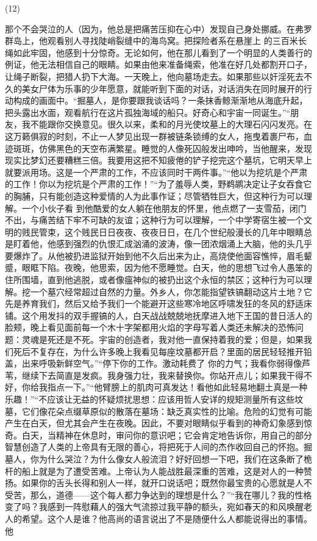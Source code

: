 \documentclass{article}
\begin{document}
(12) 

那个不会哭泣的人（因为，他总是把痛苦压抑在心中）发现自己身处挪威。在弗罗群岛上，他观看别人寻找陡峭裂缝中的海鸟窝。把探险者系在悬崖上
\newpage
的三百米长绳如此牢固，他感到十分惊奇。无论如何，他在那儿看到了一个明显的人类善行的例证，他无法相信自己的眼睛。如果由他来准备绳索，他准在好几处都割开口子，让绳子断裂，把猎人扔下大海。一天晚上，他向墓场走去。如果那些以奸淫死去不久的美女尸体为乐事的少年愿意，就能听到下面的对话，对话消失在同时展开的行动构成的画面中。“掘墓人，是你要跟我谈话吗？一条抹香鲸渐渐地从海底升起，把头露出水面，观看航行在这片孤独海域的船只。好奇心和宇宙一同诞生。”“朋友，我不能跟你交换意见。很久以来，柔和的月光使坟墓上的大理石闪闪发亮。在这万籁俱寂的时刻，不止一人梦见出现一群被链条锁缚的女人，拖曳着裹尸布，血迹斑斑，仿佛黑色的天空布满繁星。睡觉的人像死囚般发出呻吟，当他醒来，发现现实比梦幻还要糟糕三倍。我要用这把不知疲倦的铲子挖完这个墓坑，它明天早上就要派用场。这是一个严肃的工作，不应该同时干两件事。”“他以为挖坑是个严肃的工作！你以为挖坑是个严肃的工作！”“为了羞辱人类，野鹈鹕决定让子女吞食它的胸脯，只有能创造这种爱情的人为此事作证；尽管牺牲巨大，但这种行为可以理解。一个小伙子看
\newpage
到他酷爱的女人躺在他朋友的怀里，他点燃了一支雪茄，闭门不出，与痛苦结下牢不可缺的友谊；这种行为可以理解，一个中学寄宿生被一个文明的贱民管束，这个贱民日日夜夜、夜夜日日，在几个世纪般漫长的几年中眼睛总是盯着他，他感到强烈的仇恨汇成汹涌的波涛，像一团浓烟涌上大脑，他的头几乎要爆炸了。从他被扔进监狱开始到他不久后出来为止，高烧使他面容憔悴，眉毛颦蹙，眼眶下陷。夜晚，他思索，因为他不愿睡觉。白天，他的思想飞过令人愚笨的住所围墙，直到他逃脱，或者像瘟神似的被扔出这个永恒的禁区；这种行为可以理解。挖一个墓穴经常超过自然的力量。外乡人，你怎能指望铁镐翻动这片土地？它先是养育我们，然后又给予我们一个能避开这些寒冷地区呼啸发狂的冬风的舒适床铺。这个用发抖的双手握镐的人，白天战战兢兢地抚摩进入地下王国的昔日活人的脸颊，晚上看见面前每一个木十字架都用火焰的字母写着人类还未解决的恐怖问题：灵魂是死还是不死。宇宙的创造者，我对他一直保持着我的爱；但是，如果我们死后不复存在，为什么许多晚上我看见每座坟墓都开启？里面的居民轻轻推开铅盖，出来呼吸新鲜空气。”“停下你的工作。激动耗费了
\newpage
你的力气；我看你弱得像芦苇，继续下去简直是发疯。我身强力壮，我来替换你。你站开点儿；如果我干得不好，你给我指点一下。”“他臂膀上的肌肉可真发达！看他如此轻易地翻土真是一种乐趣！”“不应该让无益的怀疑烦扰思想：应该用哲人安详的规矩测量所有这些坟墓，它们像花朵点缀草原似的散落在墓场：缺乏真实性的比喻。危险的幻觉有可能产生在白天，但尤其会产生在夜晚。因此，不要对眼睛似乎看到的神奇幻象感到惊奇。白天，当精神在休息时，审问你的意识吧；它会肯定地告诉你，用自己的部分智慧创造了人类的上帝具有无限的善心，将把死于人间的杰作收回自己的怀抱。掘墓人，你为什么哭泣？为什么像女人般流泪？好好回想一下吧，我们在这条断了桅杆的船上就是为了遭受苦难。上帝认为人能战胜最深重的苦难，这是对人的一种赞扬。如果你的舌头长得和别人一样，就开口说话吧；既然你最宝贵的心愿就是人不受苦，那么，道德——这个每人都力争达到的理想是什么？”“我在哪儿？我的性格变了吗？我感到一阵慰藉人的强大气流掠过我平静的额头，宛如春天的和风唤醒老人的希望。这个人是谁？他高尚的语言说出了不是随便什么人都能说得出的事情。他
\end{document}
